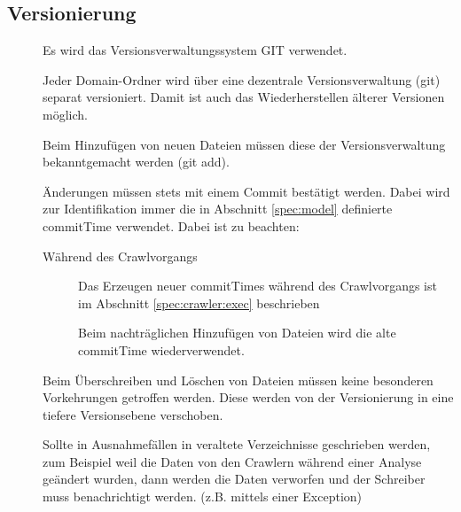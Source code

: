 \subsection{Versionierung}
\begin{description}
	\item []
		Es wird das Versionsverwaltungssystem GIT verwendet.
	\item []	
		Jeder Domain-Ordner wird über eine dezentrale Versionsverwaltung (git) separat versioniert. 
		Damit ist auch das Wiederherstellen älterer Versionen möglich.
	\item []
		Beim Hinzufügen von neuen Dateien müssen diese der Versionsverwaltung bekanntgemacht werden (git add).
	\item []
		Änderungen müssen stets mit einem Commit bestätigt werden.
		Dabei wird zur Identifikation immer die in Abschnitt \ref{spec:model} 
		definierte commitTime verwendet.
		Dabei ist zu beachten:
		\begin{description}
			\item [Während des Crawlvorgangs]
				Das Erzeugen neuer commitTimes während des Crawlvorgangs ist 
				im Abschnitt \ref{spec:crawler:exec} beschrieben
			\item []
				Beim nachträglichen Hinzufügen von Dateien wird die alte commitTime wiederverwendet.
		\end{description}
	\item []
		Beim Überschreiben und Löschen von Dateien müssen keine besonderen Vorkehrungen getroffen werden.
		Diese werden von der Versionierung in eine tiefere Versionsebene verschoben.
	\item []
		Sollte in Ausnahmefällen in veraltete Verzeichnisse geschrieben werden, 
		zum Beispiel weil die Daten von den Crawlern während einer Analyse geändert wurden,
		dann werden die Daten verworfen und der Schreiber muss benachrichtigt werden.
		(z.B. mittels einer Exception)
\end{description}


